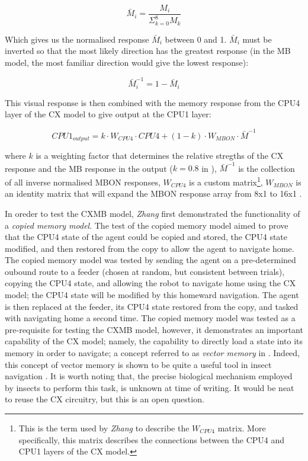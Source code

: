 \documentclass[a4paper,11pt,twoside,openright]{article}
\begin{document}
\begin{equation}
  \bar{M}_i = \frac{M_i}{\Sigma^{8}_{k = 0} M_k}
\end{equation}

Which gives us the normalised response $\bar{M}_i$ between 0 and 1. $\bar{M}_i$
must be inverted so that the most likely direction has the greatest response
(in the MB model, the most familiar direction would give the lowest response):

\begin{equation}
  \bar{M}^{-1}_i = 1 - \bar{M}_i
\end{equation}

This visual response is then combined with the memory response from the CPU4
layer of the CX model to give output at the CPU1 layer:

\begin{equation}
  CPU1_{output} = k \cdot W_{CPU4} \cdot CPU4 + (1 - k) \cdot W_{MBON} \cdot
  \bar{M}^{-1}
\end{equation}

where $k$ is a weighting factor that determines the relative stregths of the CX
response and the MB response in the output ($k = 0.8$ in \cite{Zhang2017}),
$\bar{M}^{-1}$ is the collection of all inverse normalised MBON responses,
$W_{CPU4}$ is a custom matrix\footnote{This is the term used by \textit{Zhang} to
  describe   the $W_{CPU4}$ matrix. More specifically, this matrix describes the
  connections between the CPU4 and CPU1 layers of the CX model.}, $W_{MBON}$ is
an identity matrix that will expand the MBON response array from 8x1 to 16x1
\cite{Zhang2017}.
\newline
\par

In oreder to test the CXMB model, \textit{Zhang} first demonstrated the
functionality of a \textit{copied memory model}. The test of the copied memory
model aimed to prove that the CPU4 state of the agent could be copied and stored,
the CPU4 state modified, and then restored from the copy to allow the agent to
navigate home. The copied memory model was tested by sending the agent on a
pre-determined oubound route to a feeder (chosen at random, but consistent
between trials), copying the CPU4 state, and allowing the robot to navigate home
using the CX model; the CPU4 state will be modified by this homeward navigation.
The agent is then replaced at the feeder, its CPU4 state restored from the copy,
and tasked with navigating home a second time. The copied memory model was tested
as a pre-requisite for testing the CXMB model, however, it demonstrates an
important capability of the CX model; namely, the capability to directly load a
state into its memory in order to navigate; a concept referred to as
\textit{vector memory} in \cite{Webb2018}. Indeed, this concept of vector memory
is shown to be quite a useful tool in insect navigation \cite{Webb2018}. It is
worth noting that, the precise biological mechanism employed by insects to
perform this task, is unknown at time of writing. It would be neat to reuse
the CX circuitry, but this is an open question.
\newline
\par
\end{document}
